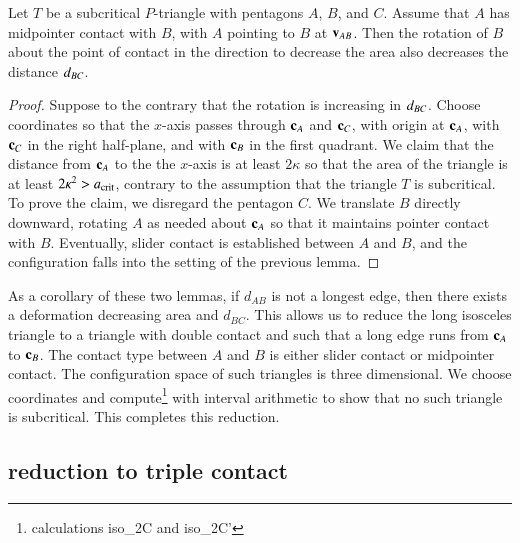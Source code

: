 \begin{lemma}  
  Let $T$ be a subcritical $P$-triangle with pentagons $A$, $B$, and
  $C$.  Assume that $A$ has midpointer contact with $B$, with $A$
  pointing to $B$ at ${\mathbf v}_{AB}$.  Then the rotation of $B$ about the
  point of contact in the direction to decrease the area also
  decreases the distance $d_{BC}$.
\end{lemma}

\begin{proof} 
  Suppose to the contrary that the rotation is increasing in
  $d_{BC}$.  Choose coordinates so that the $x$-axis passes through
  ${\mathbf c}_A$ and ${\mathbf c}_C$, with origin at ${\mathbf c}_A$, with ${\mathbf c}_C$ in the right
  half-plane, and with ${\mathbf c}_B$ in the first quadrant.  We claim that
  the distance from ${\mathbf c}_A$ to the the $x$-axis is at least $2\kappa$
  so that the area of the triangle is at least $2\kappa^2 > a_\text{crit}$,
  contrary to the assumption that the triangle $T$ is subcritical.  To
  prove the claim, we disregard the pentagon $C$.  We translate $B$
  directly downward, rotating $A$ as needed about ${\mathbf c}_A$ so that it
  maintains pointer contact with $B$.  Eventually, slider contact is
  established between $A$ and $B$, and the configuration falls into
  the setting of the previous lemma.
\end{proof}

As a corollary of these two lemmas, if $d_{AB}$ is not a longest edge, then
there exists a deformation decreasing area and $d_{BC}$.  This allows us to
 reduce the long isosceles triangle to a triangle with double
contact and such that a long edge runs from   ${\mathbf c}_A$ to ${\mathbf c}_B$.
The contact type between $A$ and $B$ is
either slider contact or midpointer contact.  The configuration space
of such triangles is three dimensional.  We choose coordinates and
compute\footnote{calculations iso\_2C and iso\_2C'} with interval
arithmetic to show that no such triangle is subcritical.  This
completes this reduction.

\subsection{reduction to triple contact}

